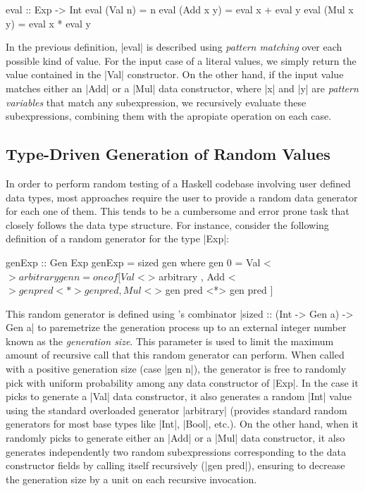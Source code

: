 \begin{code}
eval :: Exp -> Int
eval (Val n)    = n
eval (Add x y)  = eval x  +  eval y
eval (Mul x y)  = eval x  *  eval y
\end{code}

In the previous definition, |eval| is described using \emph{pattern matching}
over each possible kind of value.
%
For the input case of a literal values, we simply return the value contained in
the |Val| constructor.
%
On the other hand, if the input value matches either an |Add| or a |Mul| data
constructor, where |x| and |y| are \emph{pattern variables} that match any
subexpression, we recursively evaluate these subexpressions, combining them with
the apropiate operation on each case.

\subsection{\textbf{Type-Driven Generation of Random Values}}

In order to perform random testing of a Haskell codebase involving user defined
data types, most approaches require the user to provide a random data generator
for each one of them.
%
This tends to be a cumbersome and error prone task that closely follows the data
type structure.
%
For instance, consider the following definition of a \quickcheck random
generator for the type |Exp|:

\begin{code}
genExp :: Gen Exp
genExp = sized gen
  where
    gen 0 = Val <$> arbitrary
    gen n = oneof
      [  Val  <$> arbitrary
      ,  Add  <$> gen pred   <*> gen pred
      ,  Mul  <$> gen pred   <*> gen pred ]
\end{code} %

This random generator is defined using \quickcheck's combinator |sized :: (Int
-> Gen a) -> Gen a| to paremetrize the generation process up to an external
integer number known as the \emph{generation size}.
%
This parameter is used to limit the maximum amount of recursive call that this
random generator can perform.
%
When called with a positive generation size (case |gen n|), the generator is free
to randomly pick with uniform probability among any data constructor of |Exp|.
%
In the case it picks to generate a |Val| data constructor, it also generates a
random |Int| value using the standard overloaded generator |arbitrary|
(\quickcheck provides standard random generators for most base types like |Int|,
|Bool|, etc.).
%
On the other hand, when it randomly picks to generate either an |Add| or a |Mul|
data constructor, it also generates independently two random subexpressions
corresponding to the data constructor fields by calling itself recursively (|gen
pred|), ensuring to decrease the generation size by a unit on each recursive
invocation.


